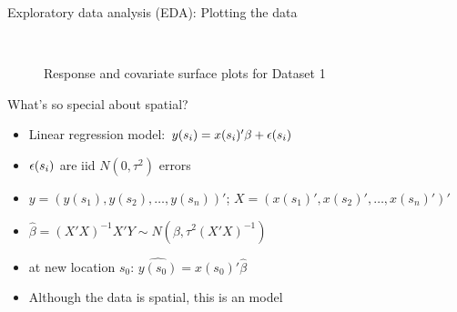 \begin{frame}{Exploratory data analysis (EDA): Plotting the data}
\begin{figure}
	\\
	\caption{Response and covariate surface plots for Dataset 1}
\end{figure}
\end{frame}

\begin{frame}{What's so special about spatial?}
	\begin{itemize}
		\item Linear regression model: $y(s_i)=x(s_i)'\beta + \epsilon(s_i)$
		\item $\epsilon(s_i)$ are iid $N(0,\tau^2)$ errors 
		\item $y=(y(s_1),y(s_2),\ldots,y(s_n))'$;  $X=(x(s_1)',x(s_2)',\ldots,x(s_n)')'$
		\item {} $\hat\beta = (X'X)^{-1}X'Y \sim N(\beta, \tau^2 (X'X)^{-1})$
		\item {} at new location $s_0$: $\widehat{y(s_0)} = x(s_0)'\hat\beta$
		\item Although the data is spatial, this is an  model
	\end{itemize}
\end{frame}

